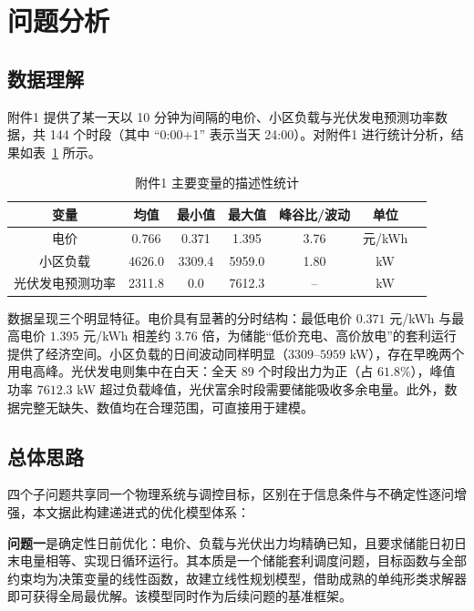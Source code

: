 \documentclass[zihao=-4,a4paper,UTF8,fontset=none]{ctexart}
\begin{document}
\section{问题分析}

\subsection{数据理解}

附件1 提供了某一天以 10 分钟为间隔的电价、小区负载与光伏发电预测功率数据，共 144 个时段（其中 ``0:00+1'' 表示当天 24:00）。对附件1 进行统计分析，结果如表~\ref{tab:data_stat} 所示。

\begin{table}[H]
  \centering
  \caption{附件1 主要变量的描述性统计}
  \label{tab:data_stat}
  \begin{tabular}{ccccccc}
    \toprule
    变量 & 均值 & 最小值 & 最大值 & 峰谷比/波动 & 单位 \\
    \midrule
    电价 & 0.766 & 0.371 & 1.395 & 3.76 & 元/kWh \\
    小区负载 & 4626.0 & 3309.4 & 5959.0 & 1.80 & kW \\
    光伏发电预测功率 & 2311.8 & 0.0 & 7612.3 & -- & kW \\
    \bottomrule
  \end{tabular}
\end{table}

数据呈现三个明显特征。电价具有显著的分时结构：最低电价 $0.371$ 元/kWh 与最高电价 $1.395$ 元/kWh 相差约 3.76 倍，为储能“低价充电、高价放电”的套利运行提供了经济空间。小区负载的日间波动同样明显（$3309$--$5959$ kW），存在早晚两个用电高峰。光伏发电则集中在白天：全天 89 个时段出力为正（占 $61.8\%$），峰值功率 $7612.3$ kW 超过负载峰值，光伏富余时段需要储能吸收多余电量。此外，数据完整无缺失、数值均在合理范围，可直接用于建模。

\subsection{总体思路}

四个子问题共享同一个物理系统与调控目标，区别在于信息条件与不确定性逐问增强，本文据此构建递进式的优化模型体系：

\textbf{问题一}是确定性日前优化：电价、负载与光伏出力均精确已知，且要求储能日初日末电量相等、实现日循环运行。其本质是一个储能套利调度问题，目标函数与全部约束均为决策变量的线性函数，故建立线性规划模型，借助成熟的单纯形类求解器即可获得全局最优解。该模型同时作为后续问题的基准框架。
\end{document}
